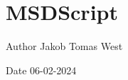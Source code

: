 \chapter{MSDScript}
\hypertarget{index}{}\label{index}
\begin{DoxyAuthor}{Author}
Jakob Tomas West
\end{DoxyAuthor}
\begin{DoxyDate}{Date}
06-\/02-\/2024 
\end{DoxyDate}
